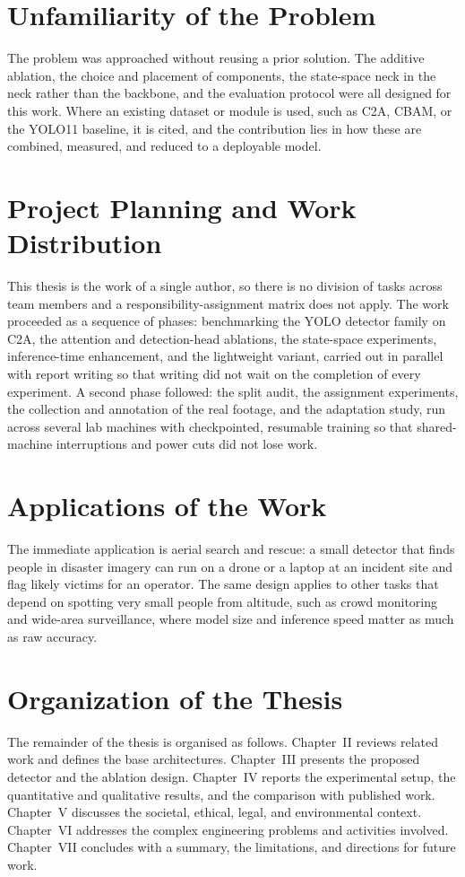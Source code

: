 \section{Unfamiliarity of the Problem}
The problem was approached without reusing a prior solution. The additive ablation,
the choice and placement of components, the state-space neck in the neck rather
than the backbone, and the evaluation protocol were all designed for this work.
Where an existing dataset or module is used, such as C2A, CBAM, or the YOLO11
baseline, it is cited, and the contribution lies in how these are combined,
measured, and reduced to a deployable model.

\section{Project Planning and Work Distribution}
This thesis is the work of a single author, so there is no division of tasks across
team members and a responsibility-assignment matrix does not apply. The work
proceeded as a sequence of phases: benchmarking the YOLO detector family on C2A,
the attention and detection-head ablations, the state-space experiments,
inference-time enhancement, and the lightweight variant, carried out in parallel
with report writing so that writing did not wait on the completion of every
experiment. A second phase followed: the split audit, the assignment
experiments, the collection and annotation of the real footage, and the
adaptation study, run across several lab machines with checkpointed,
resumable training so that shared-machine interruptions and power cuts did not
lose work.

\section{Applications of the Work}
The immediate application is aerial search and rescue: a small detector that finds
people in disaster imagery can run on a drone or a laptop at an incident site and
flag likely victims for an operator. The same design applies to other tasks that
depend on spotting very small people from altitude, such as crowd monitoring and
wide-area surveillance, where model size and inference speed matter as much as raw
accuracy.

\section{Organization of the Thesis}
The remainder of the thesis is organised as follows. Chapter~II reviews related
work and defines the base architectures. Chapter~III presents the proposed detector
and the ablation design. Chapter~IV reports the experimental setup, the
quantitative and qualitative results, and the comparison with published work.
Chapter~V discusses the societal, ethical, legal, and environmental context.
Chapter~VI addresses the complex engineering problems and activities involved.
Chapter~VII concludes with a summary, the limitations, and directions for future
work.
